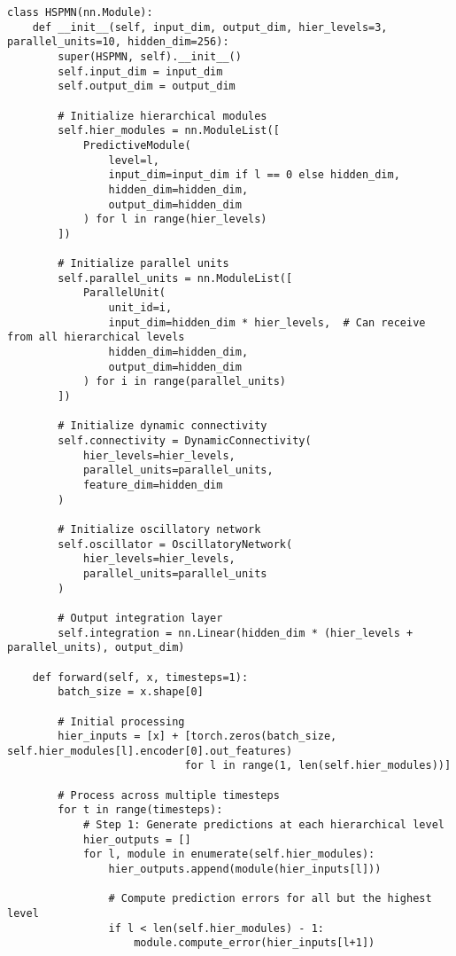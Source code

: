 \documentclass[11pt,a4paper,twocolumn]{article}
\begin{document}
\begin{lstlisting}[caption={Complete HSPMN PyTorch Implementation}, label={lst:hspmn-pytorch}]
class HSPMN(nn.Module):
    def __init__(self, input_dim, output_dim, hier_levels=3, parallel_units=10, hidden_dim=256):
        super(HSPMN, self).__init__()
        self.input_dim = input_dim
        self.output_dim = output_dim

        # Initialize hierarchical modules
        self.hier_modules = nn.ModuleList([
            PredictiveModule(
                level=l,
                input_dim=input_dim if l == 0 else hidden_dim,
                hidden_dim=hidden_dim,
                output_dim=hidden_dim
            ) for l in range(hier_levels)
        ])

        # Initialize parallel units
        self.parallel_units = nn.ModuleList([
            ParallelUnit(
                unit_id=i,
                input_dim=hidden_dim * hier_levels,  # Can receive from all hierarchical levels
                hidden_dim=hidden_dim,
                output_dim=hidden_dim
            ) for i in range(parallel_units)
        ])

        # Initialize dynamic connectivity
        self.connectivity = DynamicConnectivity(
            hier_levels=hier_levels,
            parallel_units=parallel_units,
            feature_dim=hidden_dim
        )

        # Initialize oscillatory network
        self.oscillator = OscillatoryNetwork(
            hier_levels=hier_levels,
            parallel_units=parallel_units
        )

        # Output integration layer
        self.integration = nn.Linear(hidden_dim * (hier_levels + parallel_units), output_dim)

    def forward(self, x, timesteps=1):
        batch_size = x.shape[0]

        # Initial processing
        hier_inputs = [x] + [torch.zeros(batch_size, self.hier_modules[l].encoder[0].out_features) 
                            for l in range(1, len(self.hier_modules))]

        # Process across multiple timesteps
        for t in range(timesteps):
            # Step 1: Generate predictions at each hierarchical level
            hier_outputs = []
            for l, module in enumerate(self.hier_modules):
                hier_outputs.append(module(hier_inputs[l]))

                # Compute prediction errors for all but the highest level
                if l < len(self.hier_modules) - 1:
                    module.compute_error(hier_inputs[l+1])


\end{lstlisting}
\end{document}
